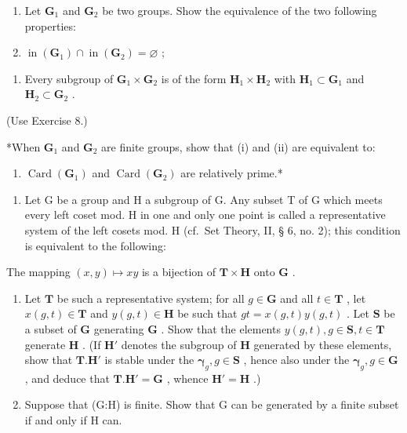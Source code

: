 \begin{enumerate}
\def\labelenumi{(\alph{enumi})}
\setcounter{enumi}{2}
\item
  Let \(\mathbf{G}_1\) and \(\mathbf{G}_2\) be two groups. Show the equivalence of the two following properties:
\item
  \(\operatorname{in}(\mathbf{G}_1) \cap \operatorname{in}(\mathbf{G}_2) = \varnothing\) ;
\end{enumerate}

\begin{enumerate}
\def\labelenumi{(\roman{enumi})}
\setcounter{enumi}{1}
\tightlist
\item
  Every subgroup of \(\mathbf{G}_1\times \mathbf{G}_2\) is of the form \(\mathbf{H}_1\times \mathbf{H}_2\) with \(\mathbf{H}_1\subset \mathbf{G}_1\) and \(\mathbf{H}_2\subset \mathbf{G}_2\) .
\end{enumerate}

(Use Exercise 8.)

*When \(\mathbf{G}_1\) and \(\mathbf{G}_2\) are finite groups, show that (i) and (ii) are equivalent to:

\begin{enumerate}
\def\labelenumi{(\roman{enumi})}
\setcounter{enumi}{2}
\tightlist
\item
  \(\operatorname{Card}(\mathbf{G}_1)\) and \(\operatorname{Card}(\mathbf{G}_2)\) are relatively prime.*
\end{enumerate}

\begin{enumerate}
\def\labelenumi{\arabic{enumi}.}
\setcounter{enumi}{13}
\tightlist
\item
  Let G be a group and H a subgroup of G. Any subset T of G which meets every left coset mod. H in one and only one point is called a representative system of the left cosets mod. H (cf.~Set Theory, II, § 6, no. 2); this condition is equivalent to the following:
\end{enumerate}

The mapping \((x,y)\mapsto xy\) is a bijection of \(\mathbf{T}\times \mathbf{H}\) onto \(\mathbf{G}\) .

\begin{enumerate}
\def\labelenumi{(\alph{enumi})}
\item
  Let \(\mathbf{T}\) be such a representative system; for all \(g \in \mathbf{G}\) and all \(t \in \mathbf{T}\) , let \(x(g, t) \in \mathbf{T}\) and \(y(g, t) \in \mathbf{H}\) be such that \(gt = x(g, t)y(g, t)\) . Let \(\mathbf{S}\) be a subset of \(\mathbf{G}\) generating \(\mathbf{G}\) . Show that the elements \(y(g, t), g \in \mathbf{S}, t \in \mathbf{T}\) generate \(\mathbf{H}\) . (If \(\mathbf{H}'\) denotes the subgroup of \(\mathbf{H}\) generated by these elements, show that \(\mathbf{T}.\mathbf{H}'\) is stable under the \(\boldsymbol{\gamma}_g, g \in \mathbf{S}\) , hence also under the \(\boldsymbol{\gamma}_g, g \in \mathbf{G}\) , and deduce that \(\mathbf{T}.\mathbf{H}' = \mathbf{G}\) , whence \(\mathbf{H}' = \mathbf{H}\) .)
\item
  Suppose that (G:H) is finite. Show that G can be generated by a finite subset if and only if H can.
\end{enumerate}

